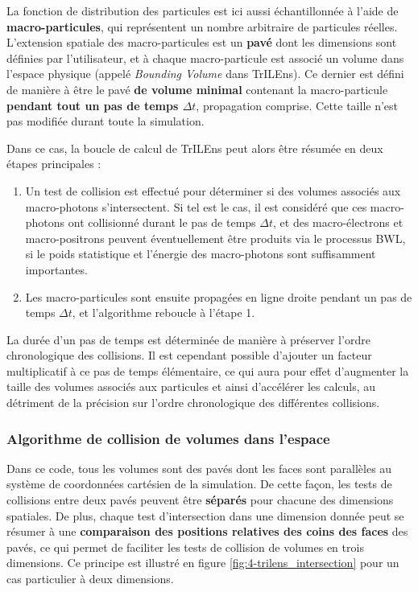 \begin{refsection}
La fonction de distribution des particules est ici aussi échantillonnée à l'aide de \textbf{macro-particules}, qui représentent un nombre arbitraire de particules réelles. L'extension spatiale des macro-particules est un \textbf{pavé} dont les dimensions sont définies par l'utilisateur, et à chaque macro-particule est associé un volume dans l'espace physique (appelé \textit{Bounding Volume} dans TrILEns). Ce dernier est défini de manière à être le pavé \textbf{de volume minimal} contenant la macro-particule \textbf{pendant tout un pas de temps $\Delta t$}, propagation comprise. Cette taille n'est pas modifiée durant toute la simulation.

Dans ce cas, la boucle de calcul de TrILEns peut alors être résumée en deux étapes principales :

\begin{enumerate}
    \item Un test de collision est effectué pour déterminer si des volumes associés aux macro-photons s'intersectent. Si tel est le cas, il est considéré que ces macro-photons ont collisionné durant le pas de temps $\Delta t$, et des macro-électrons et macro-positrons peuvent éventuellement être produits via le processus BWL, si le poids statistique et l'énergie des macro-photons sont suffisamment importantes.
    \item Les macro-particules sont ensuite propagées en ligne droite pendant un pas de temps $\Delta t$, et l’algorithme reboucle à l'étape 1.
\end{enumerate}

La durée d'un pas de temps est déterminée de manière à préserver l'ordre chronologique des collisions. Il est cependant possible d'ajouter un facteur multiplicatif à ce pas de temps élémentaire, ce qui aura pour effet d'augmenter la taille des volumes associés aux particules et ainsi d'accélérer les calculs, au détriment de la précision sur l'ordre chronologique des différentes collisions.

\subsubsection{Algorithme de collision de volumes dans l'espace}

Dans ce code, tous les volumes sont des pavés dont les faces sont parallèles au système de coordonnées cartésien de la simulation. De cette façon, les tests de collisions entre deux pavés peuvent être \textbf{séparés} pour chacune des dimensions spatiales. De plus, chaque test d'intersection dans une dimension donnée peut se résumer à une \textbf{comparaison des positions relatives des coins des faces} des pavés, ce qui permet de faciliter les tests de collision de volumes en trois dimensions. Ce principe est illustré en figure \ref{fig:4-trilens_intersection} pour un cas particulier à deux dimensions.


\end{refsection}
